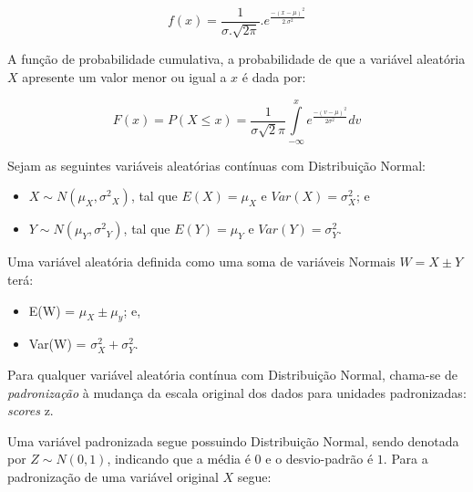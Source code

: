 \documentclass[
]{book}
\providecommand{\tightlist}{%
  \setlength{\itemsep}{0pt}\setlength{\parskip}{0pt}}
\begin{document}
\hfill\break

\[
f(x)=\frac{1}{ {\sigma . \sqrt {2\pi }}}. e^\frac{{-(x-\mu)^{2}}}{2.\sigma^{2}}
\]

\hfill\break

A função de probabilidade cumulativa, a probabilidade de que a variável aleatória \(X\) apresente um valor menor ou igual a \(x\) é dada por:

\hfill\break

\[
F(x) = P(X\le x) =  \frac{1}{\sigma \sqrt{2}\pi } \underset{-\infty }{\overset{x}{\int }} {e^ \frac{-(v - \mu)^{2}}{2\sigma^{2}}}dv
\]

\hfill\break

Sejam as seguintes variáveis aleatórias contínuas com Distribuição Normal:

\hfill\break

\begin{itemize}
\tightlist
\item
  \(X \sim N(\mu_{X}, {\sigma^{2}}_{X})\), tal que \(E(X)=\mu_{X}\) e \(Var(X)= \sigma^{2}_{X}\); e\\
\item
  \(Y \sim N(\mu_{Y}, {\sigma^{2}}_{Y})\), tal que \(E(Y)=\mu_{Y}\) e \(Var(Y)= \sigma^{2}_{Y}\).
\end{itemize}

\hfill\break

Uma variável aleatória definida como uma soma de variáveis Normais \(W=X \pm Y\) terá:

\hfill\break

\begin{itemize}
\tightlist
\item
  E(W) = \(\mu_{X} \pm \mu_{y}\); e,\\
\item
  Var(W) = \(\sigma^{2}_{X} + \sigma^{2}_{Y}\).
\end{itemize}

\hfill\break

Para qualquer variável aleatória contínua com Distribuição Normal, chama-se de \emph{padronização} à mudança da escala original dos dados para unidades padronizadas: \emph{scores} z.

\hfill\break

Uma variável padronizada segue possuindo Distribuição Normal, sendo denotada por \(Z \sim N (0,1)\), indicando que a média é \(0\) e o desvio-padrão é \(1\). Para a padronização de uma variável original \(X\) segue:

\hfill\break
\end{document}
